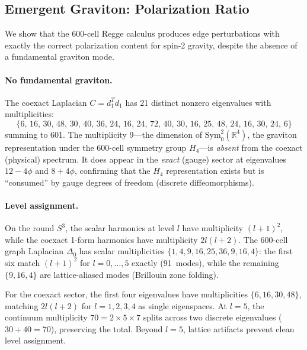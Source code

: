 \documentclass[12pt,a4paper]{article}
\theoremstyle{definition}
\begin{document}
\subsection{Emergent Graviton: Polarization Ratio}
\label{sec:S-graviton-ratio}

We show that the 600-cell Regge calculus produces edge perturbations with exactly the correct polarization content for spin-2 gravity, despite the absence of a fundamental graviton mode.

\paragraph{No fundamental graviton.}
The coexact Laplacian $C = d_1^T d_1$ has 21 distinct nonzero eigenvalues with multiplicities:
\begin{equation}
\{6,\, 16,\, 30,\, 48,\, 30,\, 40,\, 36,\, 24,\, 16,\, 24,\, 72,\, 40,\, 30,\, 16,\, 25,\, 48,\, 24,\, 16,\, 30,\, 24,\, 6\}
\end{equation}
summing to 601.  The multiplicity 9---the dimension of $\mathrm{Sym}^2_0(\mathbb{R}^4)$, the graviton representation under the 600-cell symmetry group $H_4$---is \emph{absent} from the coexact (physical) spectrum.  It does appear in the \emph{exact} (gauge) sector at eigenvalues $12 - 4\phi$ and $8 + 4\phi$, confirming that the $H_4$ representation exists but is ``consumed'' by gauge degrees of freedom (discrete diffeomorphisms).

\paragraph{Level assignment.}
On the round $S^3$, the scalar harmonics at level $l$ have multiplicity $(l+1)^2$, while the coexact 1-form harmonics have multiplicity $2l(l+2)$.  The 600-cell graph Laplacian $\Delta_0$ has scalar multiplicities $\{1, 4, 9, 16, 25, 36, 9, 16, 4\}$: the first six match $(l+1)^2$ for $l = 0, \ldots, 5$ exactly (91~modes), while the remaining $\{9, 16, 4\}$ are lattice-aliased modes (Brillouin zone folding).

For the coexact sector, the first four eigenvalues have multiplicities $\{6, 16, 30, 48\}$, matching $2l(l+2)$ for $l = 1, 2, 3, 4$ as single eigenspaces.  At $l = 5$, the continuum multiplicity $70 = 2 \times 5 \times 7$ splits across two discrete eigenvalues ($30 + 40 = 70$), preserving the total.  Beyond $l = 5$, lattice artifacts prevent clean level assignment.
\end{document}

